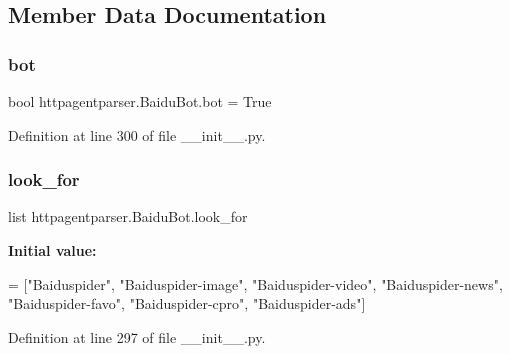 \subsection{Member Data Documentation}
\hypertarget{classhttpagentparser_1_1_baidu_bot_a2dfc73ab20ad2f4a6b3acac5cdc44d47}{}\label{classhttpagentparser_1_1_baidu_bot_a2dfc73ab20ad2f4a6b3acac5cdc44d47} 
\subsubsection{\texorpdfstring{bot}{bot}}
{\footnotesize\ttfamily bool httpagentparser.\+Baidu\+Bot.\+bot = True\hspace{0.3cm}{\ttfamily [static]}}



Definition at line 300 of file \+\_\+\+\_\+init\+\_\+\+\_\+.\+py.

\hypertarget{classhttpagentparser_1_1_baidu_bot_a3d7ac151fa1fb5ee3044041d8153f870}{}\label{classhttpagentparser_1_1_baidu_bot_a3d7ac151fa1fb5ee3044041d8153f870} 
\subsubsection{\texorpdfstring{look\+\_\+for}{look\_for}}
{\footnotesize\ttfamily list httpagentparser.\+Baidu\+Bot.\+look\+\_\+for\hspace{0.3cm}{\ttfamily [static]}}

{\bfseries Initial value\+:}
\begin{DoxyCode}
=  [\textcolor{stringliteral}{"Baiduspider"}, \textcolor{stringliteral}{"Baiduspider-image"}, \textcolor{stringliteral}{"Baiduspider-video"},
                \textcolor{stringliteral}{"Baiduspider-news"}, \textcolor{stringliteral}{"Baiduspider-favo"}, \textcolor{stringliteral}{"Baiduspider-cpro"},
                \textcolor{stringliteral}{"Baiduspider-ads"}]
\end{DoxyCode}


Definition at line 297 of file \+\_\+\+\_\+init\+\_\+\+\_\+.\+py.

\hypertarget{classhttpagentparser_1_1_baidu_bot_ab97a54f416373ce453a45a92223989d6}{}\label{classhttpagentparser_1_1_baidu_bot_ab97a54f416373ce453a45a92223989d6} 
